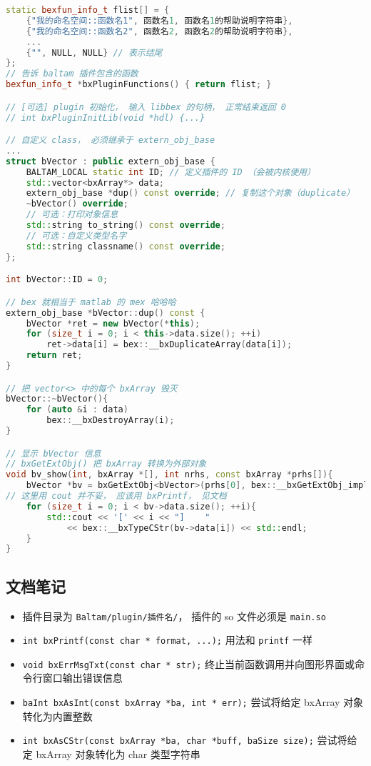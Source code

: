 \begin{lstlisting}[language=cpp,caption=vector 插件的 main.cpp]
static bexfun_info_t flist[] = {
    {"我的命名空间::函数名1", 函数名1, 函数名1的帮助说明字符串},
    {"我的命名空间::函数名2", 函数名2, 函数名2的帮助说明字符串},
    ...
    {"", NULL, NULL} // 表示结尾
};
// 告诉 baltam 插件包含的函数
bexfun_info_t *bxPluginFunctions() { return flist; }

// [可选] plugin 初始化， 输入 libbex 的句柄， 正常结束返回 0
// int bxPluginInitLib(void *hdl) {...}

// 自定义 class， 必须继承于 extern_obj_base
...
struct bVector : public extern_obj_base {
    BALTAM_LOCAL static int ID; // 定义插件的 ID （会被内核使用）
    std::vector<bxArray*> data;
    extern_obj_base *dup() const override; // 复制这个对象（duplicate）
    ~bVector() override;
    // 可选：打印对象信息
    std::string to_string() const override;
    // 可选：自定义类型名字
    std::string classname() const override;
};

int bVector::ID = 0;

// bex 就相当于 matlab 的 mex 哈哈哈
extern_obj_base *bVector::dup() const {
    bVector *ret = new bVector(*this);
    for (size_t i = 0; i < this->data.size(); ++i)
        ret->data[i] = bex::__bxDuplicateArray(data[i]);
    return ret;
}

// 把 vector<> 中的每个 bxArray 毁灭
bVector::~bVector(){
    for (auto &i : data)
        bex::__bxDestroyArray(i);
}

// 显示 bVector 信息
// bxGetExtObj() 把 bxArray 转换为外部对象
void bv_show(int, bxArray *[], int nrhs, const bxArray *prhs[]){
    bVector *bv = bxGetExtObj<bVector>(prhs[0], bex::__bxGetExtObj_impl);
// 这里用 cout 并不妥， 应该用 bxPrintf， 见文档
    for (size_t i = 0; i < bv->data.size(); ++i){
        std::cout << '[' << i << "]    "
            << bex::__bxTypeCStr(bv->data[i]) << std::endl;
    }
}
\end{lstlisting}

\subsection{文档笔记}
\begin{itemize}
\item 插件目录为 \verb|Baltam/plugin/插件名/|， 插件的 so 文件必须是 \verb|main.so|
\item \verb|int bxPrintf(const char * format, ...);| 用法和 \verb|printf| 一样
\item \verb|void bxErrMsgTxt(const char * str);| 终止当前函数调用并向图形界面或命令行窗口输出错误信息
\item \verb|baInt bxAsInt(const bxArray *ba, int * err);| 尝试将给定 bxArray 对象转化为内置整数
\item \verb|int bxAsCStr(const bxArray *ba, char *buff, baSize size);| 尝试将给定 bxArray 对象转化为 char 类型字符串
\end{itemize}

